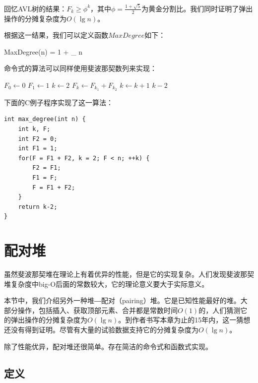 \documentclass[b5paper]{ctexart}
\begin{document}
回忆AVL树的结果：$F_k \geq \phi^k$，其中$\phi = \frac{1+\sqrt{5}}{2}$为黄金分割比。我们同时证明了弹出操作的分摊复杂度为$O(\lg n)$。

根据这一结果，我们可以定义函数$MaxDegree$如下：

\be
  MaxDegree(n) = 1 + \lfloor \log_{\phi} n \rfloor
\ee

命令式的算法可以同样使用斐波那契数列来实现：

\begin{algorithmic}[1]
  \State $F_0 \gets 0$
  \State $F_1 \gets 1$
  \State $k \gets 2$
  \Repeat
    \State $F_k \gets F_{k_1} + F_{k_2}$
    \State $k \gets k+1$
  \State \Return $k-2$
\EndFunction
\end{algorithmic}

下面的C例子程序实现了这一算法：

\lstset{language=C}
\begin{lstlisting}
int max_degree(int n) {
    int k, F;
    int F2 = 0;
    int F1 = 1;
    for(F = F1 + F2, k = 2; F < n; ++k) {
        F2 = F1;
        F1 = F;
        F = F1 + F2;
    }
    return k-2;
}
\end{lstlisting}


\section{配对堆}
\label{pairing-heap} 

虽然斐波那契堆在理论上有着优异的性能，但是它的实现复杂。人们发现斐波那契堆复杂度中big-O后面的常数较大，它的理论意义要大于实际意义。

本节中，我们介绍另外一种堆―配对（pairing）堆。它是已知性能最好的堆。大部分操作，包括插入、获取顶部元素、合并都是常数时间$O(1)$的，人们猜测它的弹出操作的分摊复杂度为$O(\lg n)$\cite{pairing-heap}\cite{okasaki-book}。到作者书写本章为止的15年内，这一猜想还没有得到证明。尽管有大量的试验数据支持它的分摊复杂度为$O(\lg n)$。

除了性能优异，配对堆还很简单。存在简洁的命令式和函数式实现。

\subsection{定义}
\end{document}
